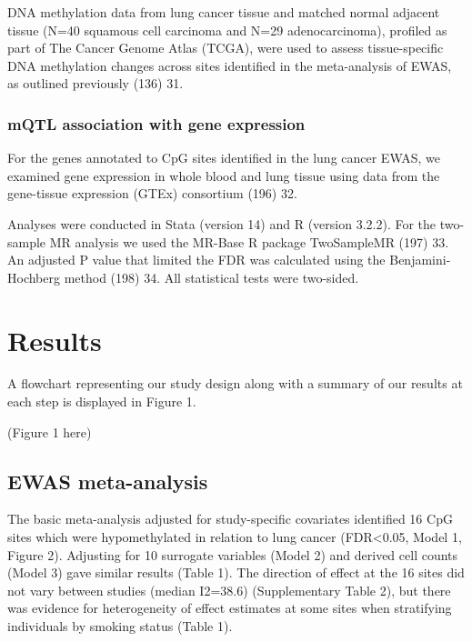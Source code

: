 \documentclass[11pt,oneside]{bristolthesis}
\begin{document}
DNA methylation data from lung cancer tissue and matched normal adjacent tissue (N=40 squamous cell carcinoma and N=29 adenocarcinoma), profiled as part of The Cancer Genome Atlas (TCGA), were used to assess tissue-specific DNA methylation changes across sites identified in the meta-analysis of EWAS, as outlined previously (136) 31.

\hypertarget{mqtl-association-with-gene-expression}{%
\subsubsection{mQTL association with gene expression}\label{mqtl-association-with-gene-expression}}

For the genes annotated to CpG sites identified in the lung cancer EWAS, we examined gene expression in whole blood and lung tissue using data from the gene-tissue expression (GTEx) consortium (196) 32.

Analyses were conducted in Stata (version 14) and R (version 3.2.2). For the two-sample MR analysis we used the MR-Base R package TwoSampleMR (197) 33. An adjusted P value that limited the FDR was calculated using the Benjamini-Hochberg method (198) 34. All statistical tests were two-sided.

\hypertarget{results-07}{%
\section{Results}\label{results-07}}

A flowchart representing our study design along with a summary of our results at each step is displayed in Figure 1.

(Figure 1 here)

\hypertarget{results-ewas-meta-analysis}{%
\subsection{EWAS meta-analysis}\label{results-ewas-meta-analysis}}

The basic meta-analysis adjusted for study-specific covariates identified 16 CpG sites which were hypomethylated in relation to lung cancer (FDR\textless0.05, Model 1, Figure 2). Adjusting for 10 surrogate variables (Model 2) and derived cell counts (Model 3) gave similar results (Table 1). The direction of effect at the 16 sites did not vary between studies (median I2=38.6) (Supplementary Table 2), but there was evidence for heterogeneity of effect estimates at some sites when stratifying individuals by smoking status (Table 1).
\end{document}
